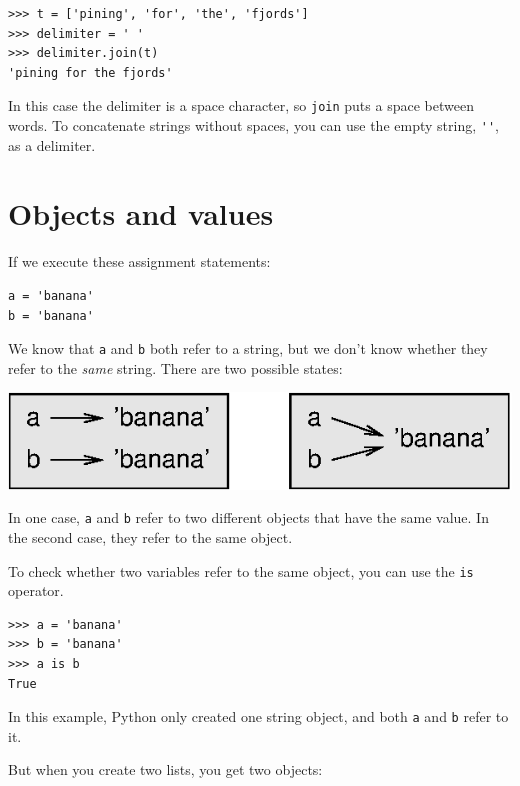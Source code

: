 \documentclass[10pt]{book}
\begin{document}

\beforeverb
\begin{verbatim}
>>> t = ['pining', 'for', 'the', 'fjords']
>>> delimiter = ' '
>>> delimiter.join(t)
'pining for the fjords'
\end{verbatim}
\afterverb
%
In this case the delimiter is a space character, so
{\tt join} puts a space between words.  To concatenate
strings without spaces, you can use the empty string,
\verb"''", as a delimiter. 



\section{Objects and values}


If we execute these assignment statements:

\beforeverb
\begin{verbatim}
a = 'banana'
b = 'banana'
\end{verbatim}
\afterverb
%
We know that {\tt a} and {\tt b} both refer to a
string, but we don't
know whether they refer to the {\em same} string.
There are two possible states:


\beforefig
\centerline{\includegraphics{figs/list1.eps}}
\afterfig

In one case, {\tt a} and {\tt b} refer to two different objects that
have the same value.  In the second case, they refer to the same
object.


To check whether two variables refer to the same object, you can
use the {\tt is} operator.

\beforeverb
\begin{verbatim}
>>> a = 'banana'
>>> b = 'banana'
>>> a is b
True
\end{verbatim}
\afterverb
%
In this example, Python only created one string object,
and both {\tt a} and {\tt b} refer to it.

But when you create two lists, you get two objects:
\end{document}
